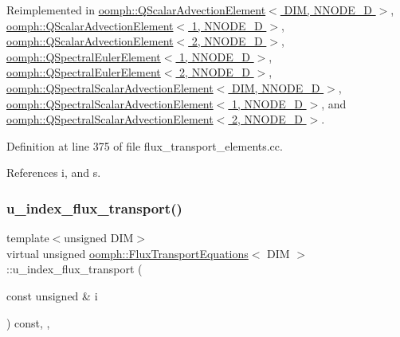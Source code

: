 Reimplemented in \hyperlink{classoomph_1_1QScalarAdvectionElement_a1e964b1183bd25bcd9a55c7e6997a4c1}{oomph\+::\+Q\+Scalar\+Advection\+Element$<$ D\+I\+M, N\+N\+O\+D\+E\+\_\+D $>$}, \hyperlink{classoomph_1_1QScalarAdvectionElement_a1e964b1183bd25bcd9a55c7e6997a4c1}{oomph\+::\+Q\+Scalar\+Advection\+Element$<$ 1, N\+N\+O\+D\+E\+\_\+D $>$}, \hyperlink{classoomph_1_1QScalarAdvectionElement_a1e964b1183bd25bcd9a55c7e6997a4c1}{oomph\+::\+Q\+Scalar\+Advection\+Element$<$ 2, N\+N\+O\+D\+E\+\_\+D $>$}, \hyperlink{classoomph_1_1QSpectralEulerElement_a026cdb8f38d01e15906db12ae1e4c4f1}{oomph\+::\+Q\+Spectral\+Euler\+Element$<$ 1, N\+N\+O\+D\+E\+\_\+D $>$}, \hyperlink{classoomph_1_1QSpectralEulerElement_a026cdb8f38d01e15906db12ae1e4c4f1}{oomph\+::\+Q\+Spectral\+Euler\+Element$<$ 2, N\+N\+O\+D\+E\+\_\+D $>$}, \hyperlink{classoomph_1_1QSpectralScalarAdvectionElement_a5d4b75608288e93077aa3132e56a113b}{oomph\+::\+Q\+Spectral\+Scalar\+Advection\+Element$<$ D\+I\+M, N\+N\+O\+D\+E\+\_\+D $>$}, \hyperlink{classoomph_1_1QSpectralScalarAdvectionElement_a5d4b75608288e93077aa3132e56a113b}{oomph\+::\+Q\+Spectral\+Scalar\+Advection\+Element$<$ 1, N\+N\+O\+D\+E\+\_\+D $>$}, and \hyperlink{classoomph_1_1QSpectralScalarAdvectionElement_a5d4b75608288e93077aa3132e56a113b}{oomph\+::\+Q\+Spectral\+Scalar\+Advection\+Element$<$ 2, N\+N\+O\+D\+E\+\_\+D $>$}.



Definition at line 375 of file flux\+\_\+transport\+\_\+elements.\+cc.



References i, and s.

\mbox{\label{classoomph_1_1FluxTransportEquations_a2de975b809b4c8a91dc5e0050dd5c9c1}} 
\subsubsection{\texorpdfstring{u\+\_\+index\+\_\+flux\+\_\+transport()}{u\_index\_flux\_transport()}}
{\footnotesize\ttfamily template$<$unsigned D\+IM$>$ \\
virtual unsigned \hyperlink{classoomph_1_1FluxTransportEquations}{oomph\+::\+Flux\+Transport\+Equations}$<$ D\+IM $>$\+::u\+\_\+index\+\_\+flux\+\_\+transport (\begin{DoxyParamCaption}\item[{const unsigned \&}]{i }\end{DoxyParamCaption}) const\hspace{0.3cm}{\ttfamily [inline]}, {\ttfamily [protected]}, {\ttfamily [virtual]}}



